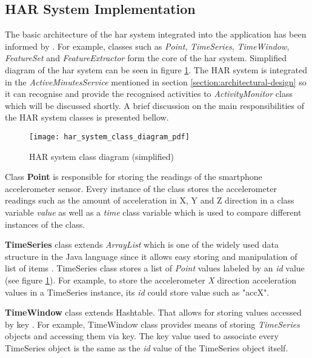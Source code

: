     \subsection{HAR System Implementation}
    The basic architecture of the \gls{har} system integrated into the application has been informed by \citet[149]{labrador2013}. For example, classes such as \textit{Point}, \textit{TimeSeries}, \textit{TimeWindow}, \textit{FeatureSet} and \textit{FeatureExtractor} form the core of the \gls{har} system. Simplified diagram of the \gls{har} system can be seen in figure \ref{fig:har_system_impl_class_diagram}. The HAR system is integrated in the \textit{ActiveMinutesService} mentioned in section \ref{section:architectural-design} so it can recognise and provide the recognised activities to \textit{ActivityMonitor} class which will be discussed shortly. A brief discussion on the main responsibilities of the HAR system classes is presented bellow.
    
    \begin{figure}[ht]
        \centering
        \texttt{[image: har\_system\_class\_diagram\_pdf]}
        \caption{HAR system class diagram (simplified)}
        \label{fig:har_system_impl_class_diagram}
    \end{figure}
    
    Class \textbf{Point} is responsible for storing the readings of the smartphone accelerometer sensor. Every instance of the class stores the accelerometer readings such as the amount of acceleration in X, Y and Z direction in a class variable \textit{value} as well as a \textit{time} class variable which is used to compare different instances of the class.
        
    \textbf{TimeSeries} class extends \textit{ArrayList} which is one of the widely used data structure in the Java language since it allows easy storing and manipulation of list of items \citep{oraclearrayList_2017}. TimeSeries class stores a list of \textit{Point} values labeled by an \textit{id} value (see figure \ref{fig:har_system_impl_class_diagram}). For example, to store the accelerometer \textit{X} direction acceleration values in a TimeSeries instance, its \textit{id} could store value such as "accX".
        
    \textbf{TimeWindow} class extends Hashtable. That allows for storing values accessed by key \citep{oraclehashtable_2017}. For example, TimeWindow class provides means of storing \textit{TimeSeries} objects and accessing them via key. The key value used to associate every TimeSeries object is the same as the \textit{id} value of the TimeSeries object itself.
    
